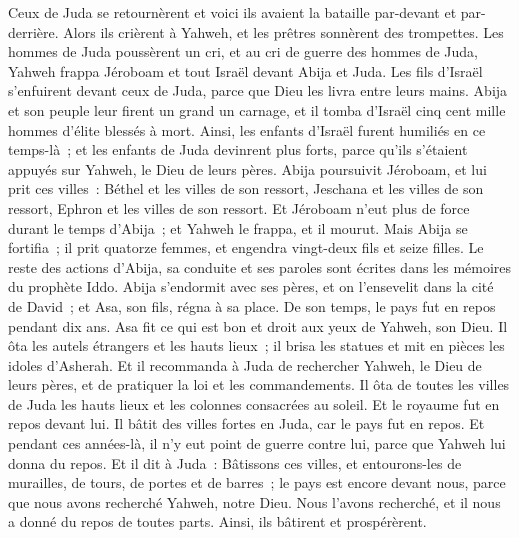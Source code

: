 \begin{multicols}{2}
Ceux de Juda se retournèrent et voici ils avaient la bataille par-devant et par-derrière. Alors ils crièrent à Yahweh, et les prêtres sonnèrent des trompettes.
Les hommes de Juda poussèrent un cri, et au cri de guerre des hommes de Juda, Yahweh frappa Jéroboam et tout Israël devant Abija et Juda.
Les fils d'Israël s'enfuirent devant ceux de Juda, parce que Dieu les livra entre leurs mains.
Abija et son peuple leur firent un grand un carnage, et il tomba d'Israël cinq cent mille hommes d'élite blessés à mort.
Ainsi, les enfants d'Israël furent humiliés en ce temps-là~; et les enfants de Juda devinrent plus forts, parce qu'ils s'étaient appuyés sur Yahweh, le Dieu de leurs pères.
 Abija poursuivit Jéroboam, et lui prit ces villes~: Béthel et les villes de son ressort, Jeschana et les villes de son ressort, Ephron et les villes de son ressort.
Et Jéroboam n'eut plus de force durant le temps d'Abija~; et Yahweh le frappa, et il mourut.
Mais Abija se fortifia~; il prit quatorze femmes, et engendra vingt-deux fils et seize filles.
Le reste des actions d'Abija, sa conduite et ses paroles sont écrites dans les mémoires du prophète Iddo.
Abija s'endormit avec ses pères, et on l'ensevelit dans la cité de David~; et Asa, son fils, régna à sa place. De son temps, le pays fut en repos pendant dix ans.
\VerseOne{}Asa fit ce qui est bon et droit aux yeux de Yahweh, son Dieu.
Il ôta les autels étrangers et les hauts lieux~; il brisa les statues et mit en pièces les idoles d'Asherah.
Et il recommanda à Juda de rechercher Yahweh, le Dieu de leurs pères, et de pratiquer la loi et les commandements.
Il ôta de toutes les villes de Juda les hauts lieux et les colonnes consacrées au soleil. Et le royaume fut en repos devant lui.
Il bâtit des villes fortes en Juda, car le pays fut en repos. Et pendant ces années-là, il n'y eut point de guerre contre lui, parce que Yahweh lui donna du repos.
Et il dit à Juda~: Bâtissons ces villes, et entourons-les de murailles, de tours, de portes et de barres~; le pays est encore devant nous, parce que nous avons recherché Yahweh, notre Dieu. Nous l'avons recherché, et il nous a donné du repos de toutes parts. Ainsi, ils bâtirent et prospérèrent.

\end{multicols}
